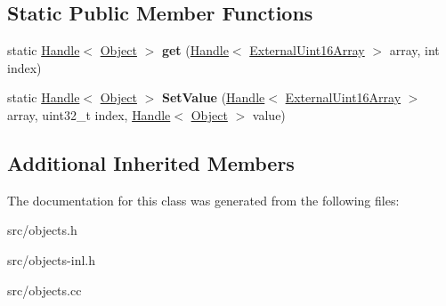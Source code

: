 \subsection*{Static Public Member Functions}
\begin{DoxyCompactItemize}
\item 
\hypertarget{classv8_1_1internal_1_1_external_uint16_array_ad4630adf33f8d8701b42ea9b345cff10}{}static \hyperlink{classv8_1_1internal_1_1_handle}{Handle}$<$ \hyperlink{classv8_1_1internal_1_1_object}{Object} $>$ {\bfseries get} (\hyperlink{classv8_1_1internal_1_1_handle}{Handle}$<$ \hyperlink{classv8_1_1internal_1_1_external_uint16_array}{External\+Uint16\+Array} $>$ array, int index)\label{classv8_1_1internal_1_1_external_uint16_array_ad4630adf33f8d8701b42ea9b345cff10}

\item 
\hypertarget{classv8_1_1internal_1_1_external_uint16_array_a12a0d96ac2dd97cc3bd8ee16193a9537}{}static \hyperlink{classv8_1_1internal_1_1_handle}{Handle}$<$ \hyperlink{classv8_1_1internal_1_1_object}{Object} $>$ {\bfseries Set\+Value} (\hyperlink{classv8_1_1internal_1_1_handle}{Handle}$<$ \hyperlink{classv8_1_1internal_1_1_external_uint16_array}{External\+Uint16\+Array} $>$ array, uint32\+\_\+t index, \hyperlink{classv8_1_1internal_1_1_handle}{Handle}$<$ \hyperlink{classv8_1_1internal_1_1_object}{Object} $>$ value)\label{classv8_1_1internal_1_1_external_uint16_array_a12a0d96ac2dd97cc3bd8ee16193a9537}

\end{DoxyCompactItemize}
\subsection*{Additional Inherited Members}


The documentation for this class was generated from the following files\+:\begin{DoxyCompactItemize}
\item 
src/objects.\+h\item 
src/objects-\/inl.\+h\item 
src/objects.\+cc\end{DoxyCompactItemize}
